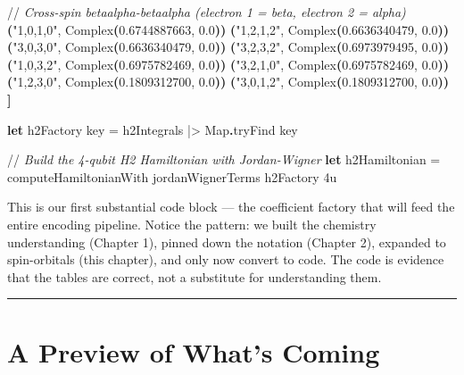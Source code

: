 \documentclass[
  11pt,
  oneside]{book}
\newenvironment{Shaded}{\begin{snugshade}}{\end{snugshade}}
\newcommand{\CommentTok}[1]{\textcolor[rgb]{0.56,0.35,0.01}{\textit{#1}}}
\newcommand{\DecValTok}[1]{\textcolor[rgb]{0.00,0.00,0.81}{#1}}
\newcommand{\FloatTok}[1]{\textcolor[rgb]{0.00,0.00,0.81}{#1}}
\newcommand{\KeywordTok}[1]{\textcolor[rgb]{0.13,0.29,0.53}{\textbf{#1}}}
\newcommand{\NormalTok}[1]{#1}
\newcommand{\OperatorTok}[1]{\textcolor[rgb]{0.81,0.36,0.00}{\textbf{#1}}}
\newcommand{\StringTok}[1]{\textcolor[rgb]{0.31,0.60,0.02}{#1}}
\begin{document}
\begin{Shaded}
\begin{Highlighting}[]
\NormalTok{    //}\CommentTok{ Cross{-}spin betaalpha{-}betaalpha (electron 1 = beta, electron 2 = alpha)}
    \OperatorTok{(}\StringTok{"1,0,1,0"}\NormalTok{, Complex}\OperatorTok{(}\FloatTok{0.6744887663}\NormalTok{, }\FloatTok{0.0}\OperatorTok{))}
    \OperatorTok{(}\StringTok{"1,2,1,2"}\NormalTok{, Complex}\OperatorTok{(}\FloatTok{0.6636340479}\NormalTok{, }\FloatTok{0.0}\OperatorTok{))}
    \OperatorTok{(}\StringTok{"3,0,3,0"}\NormalTok{, Complex}\OperatorTok{(}\FloatTok{0.6636340479}\NormalTok{, }\FloatTok{0.0}\OperatorTok{))}
    \OperatorTok{(}\StringTok{"3,2,3,2"}\NormalTok{, Complex}\OperatorTok{(}\FloatTok{0.6973979495}\NormalTok{, }\FloatTok{0.0}\OperatorTok{))}
    \OperatorTok{(}\StringTok{"1,0,3,2"}\NormalTok{, Complex}\OperatorTok{(}\FloatTok{0.6975782469}\NormalTok{, }\FloatTok{0.0}\OperatorTok{))}
    \OperatorTok{(}\StringTok{"3,2,1,0"}\NormalTok{, Complex}\OperatorTok{(}\FloatTok{0.6975782469}\NormalTok{, }\FloatTok{0.0}\OperatorTok{))}
    \OperatorTok{(}\StringTok{"1,2,3,0"}\NormalTok{, Complex}\OperatorTok{(}\FloatTok{0.1809312700}\NormalTok{, }\FloatTok{0.0}\OperatorTok{))}
    \OperatorTok{(}\StringTok{"3,0,1,2"}\NormalTok{, Complex}\OperatorTok{(}\FloatTok{0.1809312700}\NormalTok{, }\FloatTok{0.0}\OperatorTok{))}
\OperatorTok{]}

\KeywordTok{let}\NormalTok{ h2Factory key = h2Integrals |\textgreater{} Map}\KeywordTok{.}\NormalTok{tryFind key}

\NormalTok{//}\CommentTok{ Build the 4{-}qubit H2 Hamiltonian with Jordan{-}Wigner}
\KeywordTok{let}\NormalTok{ h2Hamiltonian = computeHamiltonianWith jordanWignerTerms h2Factory }\DecValTok{4}\NormalTok{u}
\end{Highlighting}
\end{Shaded}

This is our first substantial code block --- the coefficient factory
that will feed the entire encoding pipeline. Notice the pattern: we
built the chemistry understanding (Chapter 1), pinned down the notation
(Chapter 2), expanded to spin-orbitals (this chapter), and only now
convert to code. The code is evidence that the tables are correct, not a
substitute for understanding them.

\begin{center}\rule{0.5\linewidth}{0.5pt}\end{center}

\section{A Preview of What's Coming}\label{a-preview-of-whats-coming}
\end{document}
